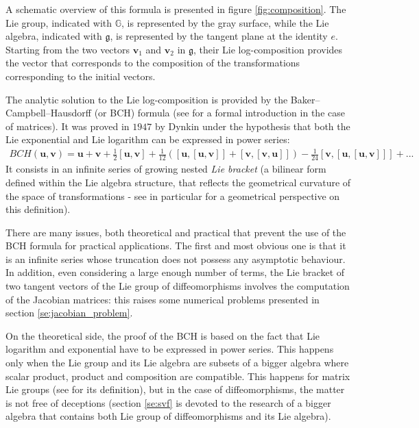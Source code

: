 A schematic overview of this formula is presented in figure \ref{fig:composition}. The Lie group, indicated with $\mathbb{G}$, is represented by the gray surface, while the Lie algebra, indicated with $\mathfrak{g}$, is represented by the tangent plane at the identity $e$.
Starting from the two vectors $\mathbf{v}_1$ and $\mathbf{v}_2$ in $\mathfrak{g}$, their Lie log-composition provides the vector that corresponds to the composition of the transformations corresponding to the initial vectors. 

The analytic solution to the Lie log-composition is provided by the Baker–Campbell–Hausdorff (or BCH) formula (see \cite{hall2015lie} for a formal introduction in the case of matrices). It was proved in $1947$ by Dynkin \cite{dynkin1947calculation} under the hypothesis that both the Lie exponential and Lie logarithm can be expressed in power series:
\begin{align*}
BCH(\mathbf{u},\mathbf{v}) 
= 
\mathbf{u} + \mathbf{v} + \frac{1}{2}[\mathbf{u},\mathbf{v}] + \frac{1}{12}([\mathbf{u},[\mathbf{u},\mathbf{v}]]
+ [\mathbf{v},[\mathbf{v},\mathbf{u}]]) - \frac{1}{24}[\mathbf{v},[\mathbf{u},[\mathbf{u},\mathbf{v}]]] +... 
\end{align*}
It consists in an infinite series of growing nested \emph{Lie bracket} (a bilinear form defined within the Lie algebra structure, that reflects the geometrical curvature of the space of transformations - see in particular \cite{misner1973gravitation} for a geometrical perspective on this definition).

There are many issues, both theoretical and practical that prevent the use of the BCH formula for practical applications. The first and most obvious one is that it is an infinite series whose truncation does not possess any asymptotic behaviour.
In addition, even considering a large enough number of terms, the Lie bracket of two tangent vectors of the Lie group of diffeomorphisms involves the computation of the Jacobian matrices: this raises some numerical problems presented in section \ref{se:jacobian_problem}.

On the theoretical side, the proof of the BCH is based on the fact that Lie logarithm and exponential have to be expressed in power series. This happens only when the Lie group and its Lie algebra are subsets of a bigger algebra where scalar product, product and composition are compatible. This happens for matrix Lie groups (see \cite{hall2015lie} for its definition), but in the case of diffeomorphisms, the matter is not free of deceptions (section \ref{se:svf} is devoted to the research of a bigger algebra that contains both Lie group of diffeomorphisms and its Lie algebra).
 

